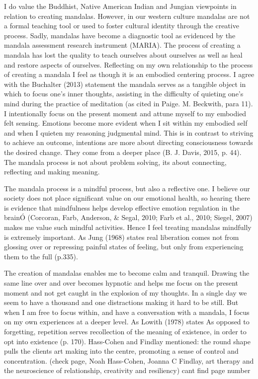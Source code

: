 I do value the Buddhist, Native American Indian and Jungian viewpoints in relation to creating mandalas. However, in our western culture mandalas are not a formal teaching tool or used to foster cultural identity through the creative process. Sadly, mandalas have become a diagnostic tool as evidenced by the mandala assessment research instrument (MARIA). The process of creating a mandala has lost the quality to teach ourselves about ourselves as well as heal and restore aspects of ourselves. 
Reflecting on my own relationship to the process of creating a mandala I feel as though it is an embodied centering process. I agree with the Buchalter (2013) statement the mandala serves as a tangible object in which to focus one's inner thoughts, assisting in the difficulty of quieting one's mind during the practice of meditation (as cited in Paige. M. Beckwith, para 11). 
I intentionally focus on the present moment and attune myself to my embodied felt sensing. Emotions become more evident when I sit within my embodied self and when I quieten my reasoning judgmental mind. This is in contrast to striving to achieve an outcome, intentions are more about directing consciousness towards the desired change. They come from a deeper place (B. J. Davis, 2015, p. 44). The mandala process is not about problem solving, its about connecting, reflecting and making meaning. 

The mandala process is a mindful process, but also a reflective one. I believe our society does not place significant value on our emotional health, so hearing there is evidence that mindfulness helps develop effective emotion regulation in the brainÓ (Corcoran, Farb, Anderson, & Segal, 2010; Farb et al., 2010; Siegel, 2007) makes me value such mindful activities. Hence I feel treating mandalas mindfully is extremely important. As Jung (1968) states real liberation comes not from glossing over or repressing painful states of feeling, but only from experiencing them to the full (p.335). 

The creation of mandalas enables me to become calm and tranquil. Drawing the same line over and over becomes hypnotic and helps me focus on the present moment and not get caught in the explosion of my thoughts. In a single day we seem to have a thousand and one distractions making it hard to be still. But when I am free to focus within, and have a conversation with a mandala, I focus on my own experiences at a deeper level. As Lowith (1978) states As opposed to forgetting, repetition serves recollection of the meaning of existence, in order to opt into existence (p. 170). Hass-Cohen and Findlay mentioned: the round shape pulls the clients art making into the centre, promoting a sense of control and concentration. (check page, Noah Hass-Cohen, Joanna C Findlay, art therapy and the neuroscience of relationship, creativity and resiliency) cant find page number

